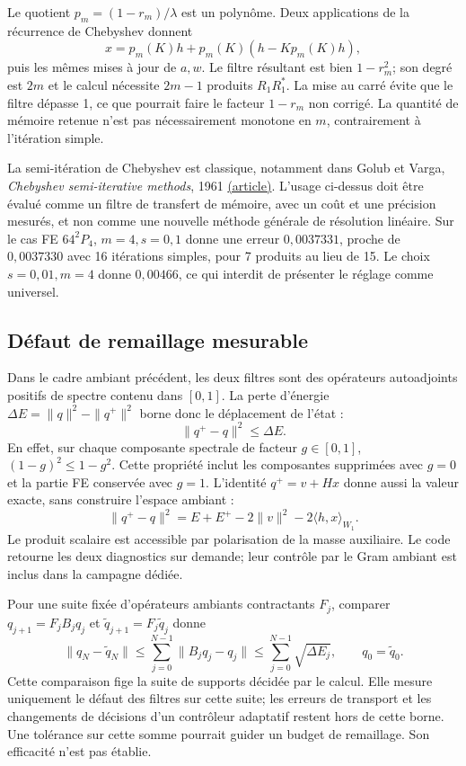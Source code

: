 \documentclass[11pt,a4paper]{article}
\begin{document}
Le quotient $p_m=(1-r_m)/\lambda$ est un polynôme. Deux applications
de la récurrence de Chebyshev donnent
\[
 x=p_m(K)h+p_m(K)(h-Kp_m(K)h),
\]
puis les mêmes mises à jour de $a,w$. Le filtre résultant est bien
$1-r_m^2$; son degré est $2m$ et le calcul nécessite $2m-1$ produits
$R_1R_1^*$. La mise au carré évite que le filtre dépasse 1, ce que
pourrait faire le facteur $1-r_m$ non corrigé. La quantité de mémoire
retenue n'est pas nécessairement monotone en $m$, contrairement à
l'itération simple.

La semi-itération de Chebyshev est classique, notamment dans
Golub et Varga, \emph{Chebyshev semi-iterative methods}, 1961
\href{https://gdz.sub.uni-goettingen.de/download/pdf/PPN362160546_0003/PPN362160546_0003.pdf}{(article)}.
L'usage ci-dessus doit être évalué comme un filtre de transfert de mémoire,
avec un coût et une précision mesurés, et non comme une nouvelle méthode
générale de résolution linéaire. Sur le cas FE $64^2P_4$, $m=4,s=0{,}1$
donne une erreur $0{,}0037331$, proche de $0{,}0037330$ avec 16 itérations
simples, pour 7 produits au lieu de 15. Le choix $s=0{,}01,m=4$ donne
$0{,}00466$, ce qui interdit de présenter le réglage comme universel.

\subsection{Défaut de remaillage mesurable}
Dans le cadre ambiant précédent, les deux filtres sont des opérateurs
autoadjoints positifs de spectre contenu dans $[0,1]$. La perte d'énergie
$\Delta E=\|q\|^2-\|q^+\|^2$ borne donc le déplacement de l'état :
\[
 \|q^+-q\|^2\leq\Delta E.
\]
En effet, sur chaque composante spectrale de facteur $g\in[0,1]$,
$(1-g)^2\leq1-g^2$. Cette propriété inclut les composantes supprimées
avec $g=0$ et la partie FE conservée avec $g=1$.
L'identité $q^+=v+Hx$ donne aussi la valeur exacte, sans construire
l'espace ambiant :
\[
 \|q^+-q\|^2=E+E^+-2\|v\|^2-2\langle h,x\rangle_{W_1}.
\]
Le produit scalaire est accessible par polarisation de la masse auxiliaire.
Le code retourne les deux diagnostics sur demande; leur contrôle par le
Gram ambiant est inclus dans la campagne dédiée.

Pour une suite fixée d'opérateurs ambiants contractants $F_j$, comparer
$q_{j+1}=F_j B_jq_j$ et $\widetilde q_{j+1}=F_j\widetilde q_j$ donne
\[
 \|q_N-\widetilde q_N\|
 \leq\sum_{j=0}^{N-1}\|B_jq_j-q_j\|
 \leq\sum_{j=0}^{N-1}\sqrt{\Delta E_j},
 \qquad q_0=\widetilde q_0.
\]
Cette comparaison fige la suite de supports décidée par le calcul.
Elle mesure uniquement le défaut des filtres sur cette suite; les
erreurs de transport et les changements de décisions d'un contrôleur
adaptatif restent hors de cette borne. Une tolérance sur cette somme
pourrait guider un budget de remaillage. Son efficacité n'est pas établie.
\end{document}
